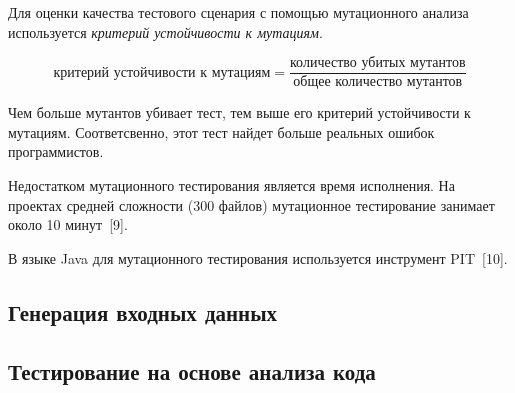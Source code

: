 Для оценки качества тестового сценария с помощью мутационного анализа используется \textit{критерий устойчивости к мутациям}.

\[ \text{критерий устойчивости к мутациям} = \frac{\text{количество убитых мутантов}}{\text{общее количество мутантов}}  \]

Чем больше мутантов убивает тест, тем выше его критерий устойчивости к мутациям. Соответсвенно, этот тест найдет больше реальных ошибок программистов. 

Недостатком мутационного тестирования является время исполнения. На проектах средней сложности (300 файлов) мутационное тестирование занимает около 10 минут~[9].

В языке Java для мутационного тестирования используется инструмент PIT~[10].

\subsection{Генерация входных данных} 
 
 

\subsection{Тестирование на основе анализа кода} 
 
 
